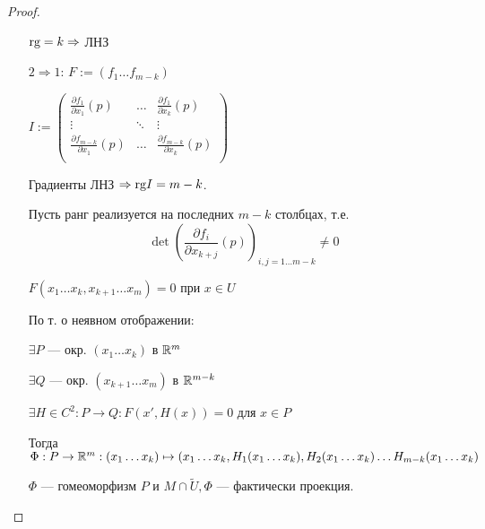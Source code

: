\begin{proof}
\begin{itemize}
              $\text{rg} = k \Rightarrow$ ЛНЗ

        \item [$2 \Rightarrow 1$:] $F := (f_1\ldots f_{m-k})$

              $I := \begin{pmatrix}
                      \frac{\partial f_1}{\partial x_1}(p)     & \ldots & \frac{\partial f_1}{\partial x_k}(p)     \\
                      \vdots                                   & \ddots & \vdots                                   \\
                      \frac{\partial f_{m-k}}{\partial x_1}(p) & \ldots & \frac{\partial f_{m-k}}{\partial x_k}(p) \\
                  \end{pmatrix}$

              Градиенты ЛНЗ $\Rightarrow \text{rg} I = m-k$.

              Пусть ранг реализуется на последних $m-k$ столбцах, т.е. $$\det\left(\frac{\partial f_i}{\partial x_{k+j}} (p)\right)_{i, j = 1\ldots m-k} \not = 0$$

              $F(x_1\ldots x_k, x_{k+1}\ldots x_m) = 0$ при $x\in U$

              По т. о неявном отображении:

              $\exists P$ --- окр. $(x_1\ldots x_k)$ в $\mathbb{R}^m$

              $\exists Q$ --- окр. $(x_{k+1}\ldots x_m)$ в $\mathbb{R}^{m-k}$

              $\exists H\in C^2 : P\to Q : F(x', H(x)) = 0$ для $x\in P$

              Тогда $\Phi : P\to\mathbb{R}^m : (x_1\ldots x_k)\mapsto(x_1\ldots x_k, H_1(x_1\ldots x_k), H_2(x_1\ldots x_k) \ldots H_{m-k}(x_1\ldots x_k)$

              $\Phi$ --- гомеоморфизм $P$ и $M \cap \tilde U, \Phi$ --- фактически проекция.

    \end{itemize}
\end{proof}

